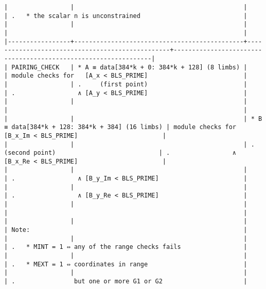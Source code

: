 \documentclass[varwidth=\maxdimen,margin=0.5cm,multi={verbatim}]{standalone}
\begin{document}
\begin{verbatim}
|                 |                                              |                                                 | .   * the scalar n is unconstrained                            |
|                 |                                              |                                                 |                                                                |
|-----------------+----------------------------------------------+-------------------------------------------------+----------------------------------------------------------------|
| PAIRING_CHECK   | * A ≡ data[384*k + 0: 384*k + 128] (8 limbs) |                                                 | module checks for   [A_x < BLS_PRIME]                          |
|                 | .     (first point)                          |                                                 | .                 ∧ [A_y < BLS_PRIME]                          |
|                 |                                              |                                                 |                                                                |
|                 |                                              | * B ≡ data[384*k + 128: 384*k + 384] (16 limbs) | module checks for   [B_x_Im < BLS_PRIME]                       |
|                 |                                              | .     (second point)                            | .                 ∧ [B_x_Re < BLS_PRIME]                       |
|                 |                                              |                                                 | .                 ∧ [B_y_Im < BLS_PRIME]                       |
|                 |                                              |                                                 | .                 ∧ [B_y_Re < BLS_PRIME]                       |
|                 |                                              |                                                 |                                                                |
|                 |                                              |                                                 | Note:                                                          |
|                 |                                              |                                                 | .   * MINT = 1 ⇔ any of the range checks fails                 |
|                 |                                              |                                                 | .   * MEXT = 1 ⇔ coordinates in range                          |
|                 |                                              |                                                 | .                but one or more G1 or G2                      |

\end{verbatim}
\end{document}
